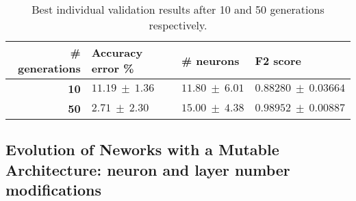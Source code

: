 \documentclass[runningheads]{llncs}
\begin{document}
\begin{table}
    \centering
    \caption{
        Best individual validation results after 10 and 50 generations
        respectively.
    }
    \label{tab:deepgprop-miniheli-validation}
    \begin{tabular}{rlll}
        \textbf{\# generations} & \textbf{Accuracy error \%} & \textbf{\# neurons} & \textbf{F2 score} \\
        \hline
        \textbf{10}             & $11.19\ \pm\ 1.36$ & $11.80\ \pm\ 6.01$ & $0.88280\ \pm\ 0.03664$ \\
        \textbf{50}             & $2.71\ \pm\ 2.30$ & $15.00\ \pm\ 4.38$ & $0.98952\ \pm\ 0.00887$ \\
    \end{tabular}
\end{table}


\subsection{Evolution of Neworks with a Mutable Architecture: neuron and layer number modifications}


\end{document}
